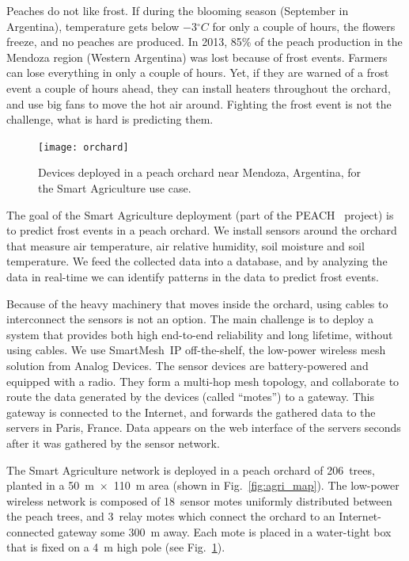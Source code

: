 \documentclass{elsarticle}
\newcommand{\smip}                {SmartMesh~IP\xspace}
\newcommand{\agri}                {Smart Agriculture\xspace}
\begin{document}

Peaches do not like frost.
If during the blooming season (September in Argentina), temperature gets below $-$3$^{\circ}C$ for only a couple of hours, the flowers freeze, and no peaches are produced.
In 2013, 85\% of the peach production in the Mendoza region (Western Argentina) was lost because of frost events.
Farmers can lose everything in only a couple of hours.
Yet, if they are warned of a frost event a couple of hours ahead, they can install heaters throughout the orchard, and use big fans to move the hot air around.
Fighting the frost event is not the challenge, what is hard is predicting them.

\begin{figure}
    \centering
    \texttt{[image: orchard]}
    \caption{Devices deployed in a peach orchard near Mendoza, Argentina, for the \agri use case.}
    \label{fig:agri_pics}
\end{figure}


The goal of the \agri deployment (part of the PEACH~\cite{watteyne16peach} project) is to predict frost events in a peach orchard.
We install sensors around the orchard that measure air temperature, air relative humidity, soil moisture and soil temperature.
We feed the collected data into a database, and by analyzing the data in real-time we can identify patterns in the data to predict frost events.


Because of the heavy machinery that moves inside the orchard, using cables to interconnect the sensors is not an option.
The main challenge is to deploy a system that provides both high end-to-end reliability and long lifetime, without using cables.
We use \smip off-the-shelf, the low-power wireless mesh solution from Analog Devices.
The sensor devices are battery-powered and equipped with a radio.
They form a multi-hop mesh topology, and collaborate to route the data generated by the devices (called ``motes'') to a gateway.
This gateway is connected to the Internet, and forwards the gathered data to the servers in Paris, France.
Data appears on the web interface of the servers seconds after it was gathered by the sensor network.


The \agri network is deployed in a peach orchard of 206~trees, planted in a 50~m~$\times$~110~m area (shown in Fig.~\ref{fig:agri_map}).
The low-power wireless network is composed of 18~sensor motes uniformly distributed between the peach trees, and 3~relay motes which connect the orchard to an Internet-connected gateway some 300~m away.
Each mote is placed in a water-tight box that is fixed on a 4~m high pole (see Fig.~\ref{fig:agri_pics}).
\end{document}
